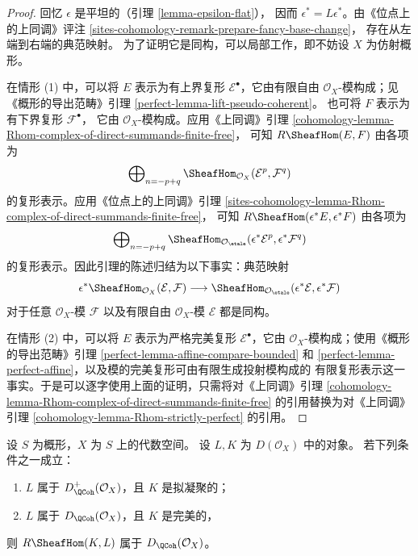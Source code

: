 \begin{proof}
回忆 $\epsilon$ 是平坦的（引理 \ref{lemma-epsilon-flat}），
因而 $\epsilon^* = L\epsilon^*$。由《位点上的上同调》评注
\ref{sites-cohomology-remark-prepare-fancy-base-change}，
存在从左端到右端的典范映射。
为了证明它是同构，可以局部工作，即不妨设 $X$ 为仿射概形。

\medskip\noindent
在情形 (1) 中，可以将 $E$ 表示为有上界复形
$\mathcal{E}^\bullet$，它由有限自由 $\mathcal{O}_X$-模构成；见《概形的导出范畴》引理
\ref{perfect-lemma-lift-pseudo-coherent}。
也可将 $F$ 表示为有下界复形 $\mathcal{F}^\bullet$，
它由 $\mathcal{O}_X$-模构成。应用《上同调》引理
\ref{cohomology-lemma-Rhom-complex-of-direct-summands-finite-free}，
可知 $R\SheafHom(E, F)$ 由各项为
$$
\bigoplus\nolimits_{n = - p + q}
\SheafHom_{\mathcal{O}_X}(\mathcal{E}^p, \mathcal{F}^q)
$$
的复形表示。应用《位点上的上同调》引理
\ref{sites-cohomology-lemma-Rhom-complex-of-direct-summands-finite-free}，
可知 $R\SheafHom(\epsilon^*E, \epsilon^*F)$ 由各项为
$$
\bigoplus\nolimits_{n = - p + q}
\SheafHom_{\mathcal{O}_\etale}
(\epsilon^*\mathcal{E}^p, \epsilon^*\mathcal{F}^q)
$$
的复形表示。因此引理的陈述归结为以下事实：典范映射
$$
\epsilon^*\SheafHom_{\mathcal{O}_X}(\mathcal{E}, \mathcal{F})
\longrightarrow
\SheafHom_{\mathcal{O}_\etale}
(\epsilon^*\mathcal{E}, \epsilon^*\mathcal{F})
$$
对于任意 $\mathcal{O}_X$-模 $\mathcal{F}$ 以及有限自由
$\mathcal{O}_X$-模 $\mathcal{E}$ 都是同构。

\medskip\noindent
在情形 (2) 中，可以将 $E$ 表示为严格完美复形
$\mathcal{E}^\bullet$，它由 $\mathcal{O}_X$-模构成；使用《概形的导出范畴》引理
\ref{perfect-lemma-affine-compare-bounded} 和
\ref{perfect-lemma-perfect-affine}，以及模的完美复形可由有限生成投射模构成的
有限复形表示这一事实。于是可以逐字使用上面的证明，只需将对《上同调》引理
\ref{cohomology-lemma-Rhom-complex-of-direct-summands-finite-free}
的引用替换为对《上同调》引理
\ref{cohomology-lemma-Rhom-strictly-perfect} 的引用。
\end{proof}

\begin{lemma}
\label{lemma-quasi-coherence-internal-hom}
设 $S$ 为概形，$X$ 为 $S$ 上的代数空间。
设 $L, K$ 为 $D(\mathcal{O}_X)$ 中的对象。
若下列条件之一成立：
\begin{enumerate}
\item $L$ 属于 $D^+_\QCoh(\mathcal{O}_X)$，且 $K$ 是拟凝聚的；
\item $L$ 属于 $D_\QCoh(\mathcal{O}_X)$，且 $K$ 是完美的，
\end{enumerate} %
则 $R\SheafHom(K, L)$ 属于 $D_\QCoh(\mathcal{O}_X)$。
\end{lemma}

